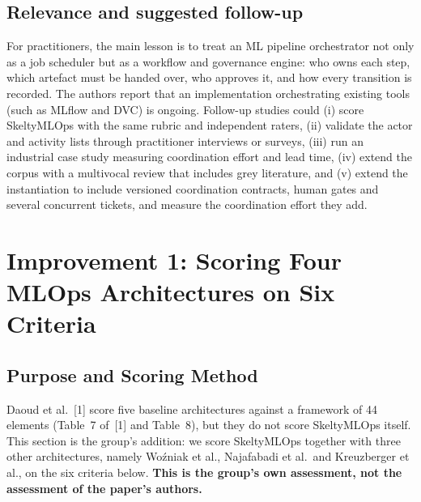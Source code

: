 \documentclass[11pt,a4paper]{article}
\begin{document}
\subsection{Relevance and suggested follow-up}

For practitioners, the main lesson is to treat an ML pipeline orchestrator not only as a job scheduler but as a workflow and governance engine: who owns each step, which artefact must be handed over, who approves it, and how every transition is recorded. The authors report that an implementation orchestrating existing tools (such as MLflow and DVC) is ongoing. Follow-up studies could (i) score SkeltyMLOps with the same rubric and independent raters, (ii) validate the actor and activity lists through practitioner interviews or surveys, (iii) run an industrial case study measuring coordination effort and lead time, (iv) extend the corpus with a multivocal review that includes grey literature, and (v) extend the instantiation to include versioned coordination contracts, human gates and several concurrent tickets, and measure the coordination effort they add.


\providecommand{\ev}[1]{\textit{``#1''}}

\providecommand{\papercite}{[1]}
\providecommand{\paperTab}[1]{Table~#1 of~\papercite}

\section{Improvement 1: Scoring Four MLOps Architectures on Six Criteria}
\label{sec:scoring}

\subsection{Purpose and Scoring Method}

Daoud et al.~\papercite{} score five baseline architectures against a framework of 44 elements (\paperTab{7} and Table~8), but they do not score SkeltyMLOps itself. This section is the group's addition: we score SkeltyMLOps together with three other architectures, namely Wo\'{z}niak et al., Najafabadi et al.\ and Kreuzberger et al., on the six criteria below. \textbf{This is the group's own assessment, not the assessment of the paper's authors.}
\end{document}
